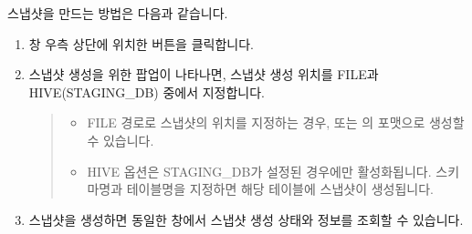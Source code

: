 \documentclass[letterpaper,10pt,english]{sphinxmanual}
\begin{document}
스냅샷을 만드는 방법은 다음과 같습니다.
\begin{enumerate}
\def\theenumi{\arabic{enumi}}
\def\labelenumi{\theenumi .}
\makeatletter\def\p@enumii{\p@enumi \theenumi .}\makeatother
\item {} 
{\hyperref[\detokenize{discovery/part07/edit_rules::doc}]{}} 창 우측 상단에 위치한  버튼을 클릭합니다.
\begin{quote}

\begin{figure}[H]
\centering

\noindent{}
\end{figure}
\end{quote}

\item {} 
스냅샷 생성을 위한 팝업이 나타나면, 스냅샷 생성 위치를 FILE과 HIVE(STAGING\_DB) 중에서 지정합니다.
\begin{quote}

\begin{figure}[H]
\centering

\noindent{}
\end{figure}
\begin{itemize}
\item {} 
FILE 경로로 스냅샷의 위치를 지정하는 경우,  또는 의 포맷으로 생성할 수 있습니다.
\begin{quote}

\begin{figure}[H]
\centering

\noindent{}
\end{figure}
\end{quote}

\item {} 
HIVE 옵션은 STAGING\_DB가 설정된 경우에만 활성화됩니다. 스키마명과 테이블명을 지정하면 해당 테이블에 스냅샷이 생성됩니다.
\begin{quote}

\begin{figure}[H]
\centering

\noindent{}
\end{figure}
\end{quote}

\end{itemize}
\end{quote}

\item {} 
스냅샷을 생성하면 동일한 창에서 스냅샷 생성 상태와 정보를 조회할 수 있습니다.
\begin{quote}

\begin{figure}[H]
\centering

\noindent{}
\end{figure}
\end{quote}

\end{enumerate}
\end{document}
